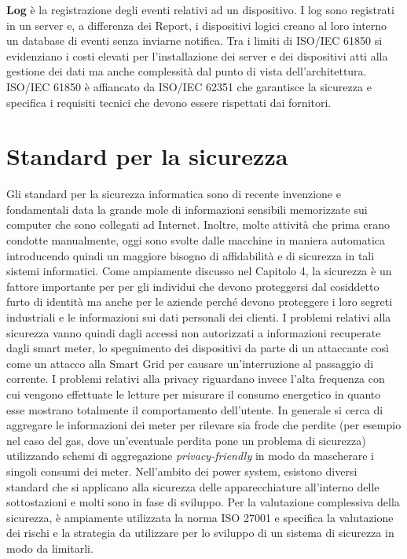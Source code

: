 \textbf{Log} è la registrazione degli eventi relativi ad un dispositivo. I log sono registrati in un server e, a differenza dei Report, i dispositivi logici creano al loro interno un database di eventi senza inviarne notifica.\newline\newline
Tra i limiti di ISO/IEC 61850 si evidenziano i costi elevati per l'installazione dei server e dei dispositivi atti alla gestione dei dati ma anche  complessità dal punto di vista dell'architettura. ISO/IEC 61850 è affiancato da ISO/IEC 62351 che garantisce la sicurezza e specifica i requisiti tecnici che devono essere rispettati dai fornitori.
\newpage
\section{Standard per la sicurezza}
Gli standard per la sicurezza informatica sono di recente invenzione e fondamentali data la grande mole di informazioni sensibili memorizzate sui computer che sono collegati ad Internet. Inoltre, molte attività che prima erano condotte manualmente, oggi sono svolte dalle macchine in maniera automatica introducendo quindi un maggiore bisogno di affidabilità e di sicurezza in tali sistemi informatici. Come ampiamente discusso nel Capitolo 4, la sicurezza è un fattore importante per per gli individui che devono proteggersi dal cosiddetto furto di identità ma anche per le aziende perché devono proteggere i loro segreti industriali e le informazioni sui dati personali dei clienti.\newline\newline
I problemi relativi alla sicurezza vanno quindi dagli accessi non autorizzati a informazioni recuperate dagli smart meter, lo spegnimento dei dispositivi da parte di un attaccante così come un attacco alla Smart Grid per causare un'interruzione al passaggio di corrente. I problemi relativi alla privacy riguardano invece l’alta frequenza con cui vengono effettuate le letture per misurare il consumo energetico in quanto esse mostrano totalmente il comportamento dell’utente. In generale si cerca di aggregare le informazioni dei meter per rilevare sia frode che perdite (per esempio nel caso del gas, dove un'eventuale perdita pone un problema di sicurezza) utilizzando schemi di aggregazione \emph{privacy-friendly} in modo da mascherare i singoli consumi dei meter.
\newline\newline
Nell'ambito dei power system, esistono diversi standard che si applicano alla sicurezza delle apparecchiature all'interno delle sottostazioni e molti sono in fase di sviluppo. Per la valutazione complessiva della sicurezza, è ampiamente utilizzata la norma ISO 27001 e specifica la valutazione dei rischi e la strategia da utilizzare per lo sviluppo di un sistema di sicurezza in modo da limitarli.
